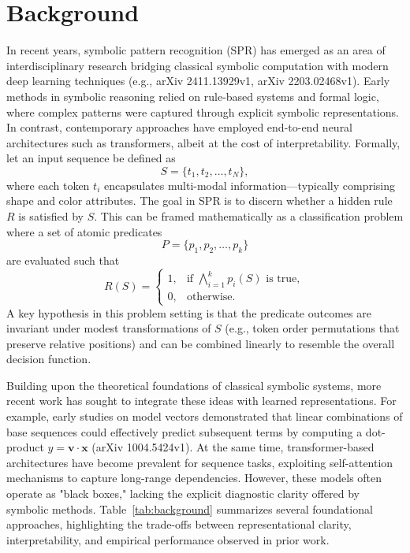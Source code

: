 \documentclass{article}
\begin{document}
\section{Background}
In recent years, symbolic pattern recognition (SPR) has emerged as an area of interdisciplinary research bridging classical symbolic computation with modern deep learning techniques (e.g., arXiv 2411.13929v1, arXiv 2203.02468v1). Early methods in symbolic reasoning relied on rule-based systems and formal logic, where complex patterns were captured through explicit symbolic representations. In contrast, contemporary approaches have employed end-to-end neural architectures such as transformers, albeit at the cost of interpretability. Formally, let an input sequence be defined as 
\[
S = \{t_1, t_2, \ldots, t_N\},
\]
where each token \(t_i\) encapsulates multi-modal information—typically comprising shape and color attributes. The goal in SPR is to discern whether a hidden rule \(R\) is satisfied by \(S\). This can be framed mathematically as a classification problem where a set of atomic predicates 
\[
P = \{p_1, p_2, \dots, p_k\}
\]
are evaluated such that
\[
R(S) = 
\begin{cases}
1, & \text{if } \bigwedge_{i=1}^{k} p_i(S) \text{ is true}, \\
0, & \text{otherwise}.
\end{cases}
\]
A key hypothesis in this problem setting is that the predicate outcomes are invariant under modest transformations of \(S\) (e.g., token order permutations that preserve relative positions) and can be combined linearly to resemble the overall decision function.

Building upon the theoretical foundations of classical symbolic systems, more recent work has sought to integrate these ideas with learned representations. For example, early studies on model vectors demonstrated that linear combinations of base sequences could effectively predict subsequent terms by computing a dot-product \(y = \mathbf{v} \cdot \mathbf{x}\) (arXiv 1004.5424v1). At the same time, transformer-based architectures have become prevalent for sequence tasks, exploiting self-attention mechanisms to capture long-range dependencies. However, these models often operate as "black boxes," lacking the explicit diagnostic clarity offered by symbolic methods. Table~\ref{tab:background} summarizes several foundational approaches, highlighting the trade-offs between representational clarity, interpretability, and empirical performance observed in prior work.
\end{document}
